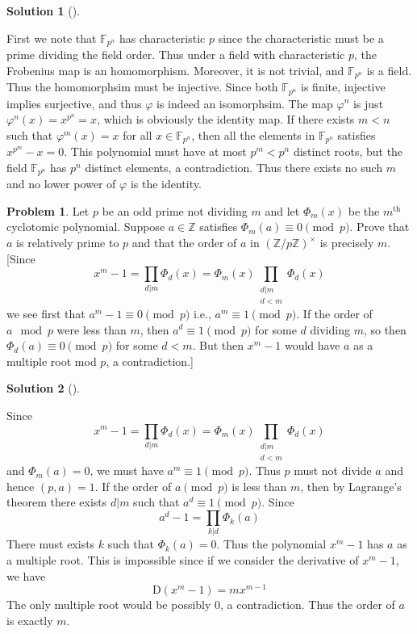 \documentclass{article}
\theoremstyle{definition}
\newtheorem{prob}{Problem}
\newtheorem*{sol}{Solution}
\newenvironment{sols}[1][]{%
  \begin{sol}[#1]$ $\par\nobreak\ignorespaces
}{%
  \end{sol}
}
\begin{document}
\begin{sols}
	First we note that $\mathbb{F}_{p^n}$ has characteristic $p$ since the characteristic must be a prime dividing the field order.
	Thus under a field with characteristic $p$, the Frobenius map is an homomorphism.
	Moreover, it is not trivial, and $\mathbb{F}_{p^n}$ is a field.
	Thus the homomorphsim must be injective.
	Since both $\mathbb{F}_{p^n}$ is finite, injective implies surjective, and thus $\varphi$ is indeed an isomorphsim.
	The map $\varphi^n$ is just $\varphi^n(x) = x^{p^n} = x$, which is obviously the identity map.
	If there exists $m < n$ such that $\varphi^m(x) = x$ for all $x \in \mathbb{F}_{p^n}$, then all the elements in $\mathbb{F}_{p^n}$ satisfies $x^{p^m} - x = 0$.
	This polynomial must have at most $p^m < p^n$ distinct roots, but the field $\mathbb{F}_{p^n}$ has $p^n$ distinct elements, a contradiction.
	Thus there exists no such $m$ and no lower power of $\varphi$ is the identity.
\end{sols}

\setcounter{prob}{14}
\begin{prob}
	Let $p$ be an odd prime not dividing $m$ and let $\Phi_m(x)$ be the $m^{\text{th}}$ cyclotomic polynomial.
	Suppose $a \in \mathbb{Z}$ satisfies $\Phi_m(a) \equiv 0 \pmod{p}$.
	Prove that $a$ is relatively prime to $p$ and that the order of $a$ in $(\mathbb{Z}/p \mathbb{Z})^\times$ is precisely $m$.
	[Since
	\[
		x^m - 1 = \prod_{d|m} \Phi_d(x) = \Phi_m(x) \prod_{\substack{d|m \\ d < m}} \Phi_d(x)
	\]
	we see first that $a^m - 1 \equiv 0 \pmod{p}$ i.e., $a^m \equiv 1 \pmod{p}$.
	If the order of $a \mod p$ were less than $m$, then $a^d \equiv 1 \pmod{p}$ for some $d$ dividing $m$, so then $\Phi_d(a) \equiv 0 \pmod{p}$ for some $d < m$.
	But then $x^m - 1$ would have $a$ as a multiple root mod $p$, a contradiction.]
\end{prob}

\begin{sols}
	Since
	\[
		x^m - 1 = \prod_{d|m} \Phi_d(x) = \Phi_m(x) \prod_{\substack{d|m \\ d < m}} \Phi_d(x)
	\]
	and $\Phi_m(a) = 0$, we must have $a^m \equiv 1 \pmod{p}$.
	Thus $p$ must not divide $a$ and hence $(p, a) = 1$.
	If the order of $a \pmod{p}$ is less than $m$, then by Lagrange's theorem there exists $d | m$ such that $a^d \equiv 1 \pmod{p}$.
	Since
	\[
		a^d - 1 = \prod_{k | d} \Phi_k(a)
	\]
	There must exists $k$ such that $\Phi_k(a) = 0$.
	Thus the polynomial $x^m - 1$ has $a$ as a multiple root.
	This is impossible since if we consider the derivative of $x^m - 1$, we have
	\[
		\mathrm{D}(x^m - 1) = m x^{m - 1}
	\]
	The only multiple root would be possibly 0, a contradiction.
	Thus the order of $a$ is exactly $m$.
\end{sols}
\end{document}
